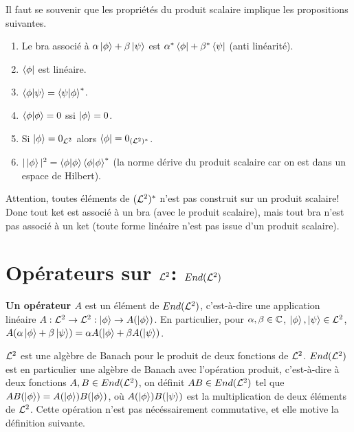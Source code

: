 Il faut se souvenir que les propriétés du produit scalaire implique les
propositions suivantes.

\begin{enumerate}
	\item Le bra associé à $\alpha \ket{\phi} + \beta \ket{\psi}$ est $\alpha^{*}
	\bra{\phi} + \beta^{*} \bra{\psi}$ (anti linéarité).
	\item $\bra{\phi}$ est linéaire.
	\item $\bra{\phi}\ket{\psi} = \bra{\psi}\ket{\phi}^{*}$.
	\item $\braket{\phi} = 0$ ssi $\ket{\phi} = 0$.
	\item Si $\ket{\phi} = 0_{\mathcal{L}^{2}}$ alors $\bra{\phi} = 0_{(\mathcal{L}^{2})^{*}}$.
	\item $|\ket{\phi}|^{2} = \braket{\phi} \braket{\phi}^{*}$ (la norme dérive
		du produit scalaire car on est dans un espace de Hilbert).
\end{enumerate}

Attention, toutes éléments de $(\mathcal{L}^{2})^{*}$ n'est pas construit sur un produit
scalaire! Donc tout ket est associé à un bra (avec le produit scalaire), mais
tout bra n'est pas associé à un ket (toute forme linéaire n'est pas issue d'un
produit scalaire).

\section{Opérateurs sur $\mathcal{L}^{2}$: $End(\mathcal{L}^{2})$}

\begin{definition} [Opérateur]
	\textbf{Un opérateur $A$} est un élément de $End(\mathcal{L}^{2})$,
c'est-à-dire une application linéaire $A : \mathcal{L}^{2} \rightarrow \mathcal{L}^{2} :
\ket{\phi} \rightarrow A(\ket{\phi})$. En particulier, pour $\alpha, \beta \in
\mathbb{C}$, $\ket{\phi}, \ket{\psi} \in \mathcal{L}^{2}$, $A(\alpha \ket{\phi} + \beta
\ket{\psi}) = \alpha A(\ket{\phi} + \beta A(\ket{\psi})$.
\end{definition}

$\mathcal{L}^{2}$ est une algèbre de Banach pour le produit de deux fonctions de
$\mathcal{L}^{2}$.
$End(\mathcal{L}^{2})$ est en particulier une algèbre de Banach avec
l'opération produit, c'est-à-dire à deux fonctions $A, B \in
End(\mathcal{L}^{2})$, on définit $AB \in End(\mathcal{L}^{2})$ tel
que $AB(\ket{\phi})= A(\ket{\phi})B(\ket{\phi})$, où $A(\ket{\phi})
B(\ket{\psi})$ est la multiplication de deux éléments de $\mathcal{L}^{2}$.
Cette opération n'est pas nécéssairement commutative, et elle motive la
définition suivante.

